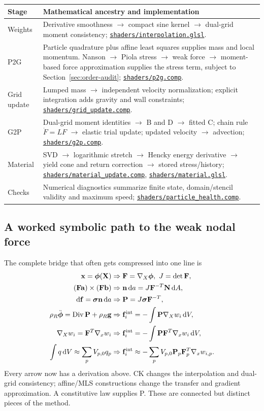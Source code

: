 \documentclass[11pt,a4paper]{article}
\newcommand{\mat}[1]{\mathbf{#1}}
\newcommand{\src}[1]{\href{../../#1}{\nolinkurl{#1}}}
\DeclareMathOperator{\Div}{Div}
\numberwithin{equation}{section}
\begin{document}
\begin{longtable}{>{\raggedright\arraybackslash}p{.20\linewidth}>{\raggedright\arraybackslash}p{.71\linewidth}}
\toprule Stage & Mathematical ancestry and implementation \\\midrule\endhead
Weights & Derivative smoothness $\to$ compact sine kernel $\to$ dual-grid moment consistency; \src{shaders/interpolation.glsl}. \\
P2G & Particle quadrature plus affine least squares supplies mass and local momentum. Nanson $\to$ Piola stress $\to$ weak force $\to$ moment-based force approximation supplies the stress term, subject to Section~\ref{sec:order-audit}; \src{shaders/p2g.comp}. \\
Grid update & Lumped mass $\to$ independent velocity normalization; explicit integration adds gravity and wall constraints; \src{shaders/grid_update.comp}. \\
G2P & Dual-grid moment identities $\to$ B and D $\to$ fitted C; chain rule $\dot F=LF$ $\to$ elastic trial update; updated velocity $\to$ advection; \src{shaders/g2p.comp}. \\
Material & SVD $\to$ logarithmic stretch $\to$ Hencky energy derivative $\to$ yield cone and return correction $\to$ stored stress/history; \src{shaders/material_update.comp}, \src{shaders/material.glsl}. \\
Checks & Numerical diagnostics summarize finite state, domain/stencil validity and maximum speed; \src{shaders/particle_health.comp}. \\\bottomrule
\end{longtable}

\subsection{A worked symbolic path to the weak nodal force}
The complete bridge that often gets compressed into one line is
\begin{align*}
\mat x=\boldsymbol\phi(\mat X)
&\Rightarrow \mat F=\nabla_X\boldsymbol\phi,\ J=\det\mat F,\\
(\mat F\mat a)\times(\mat F\mat b)
&\Rightarrow \mat n\,\mathrm da=J\mat F^{-T}\mat N\,\mathrm dA,\\
\mathrm d\mat f=\boldsymbol\sigma\mat n\,\mathrm da
&\Rightarrow \mat P=J\boldsymbol\sigma\mat F^{-T},\\
\rho_R\ddot{\boldsymbol\phi}=\Div\mat P+\rho_R\mat g
&\Rightarrow \mat f_i^{\rm int}=-\int\mat P\nabla_X w_i\,\mathrm dV,\\
\nabla_X w_i=\mat F^T\nabla_x w_i
&\Rightarrow \mat f_i^{\rm int}=-\int\mat P\mat F^T\nabla_x w_i\,\mathrm dV,\\
\int q\,\mathrm dV\approx\sum_pV_{p,0}q_p
&\Rightarrow \mat f_i^{\rm int}\approx
 -\sum_p V_{p,0}\mat P_p\mat F_p^T\nabla_x w_{i,p}.
\end{align*}
Every arrow now has a derivation above. CK changes the interpolation and dual-grid
consistency; affine/MLS constructions change the transfer and gradient
approximation. A constitutive law supplies P. These are connected but distinct
pieces of the method.
\end{document}
